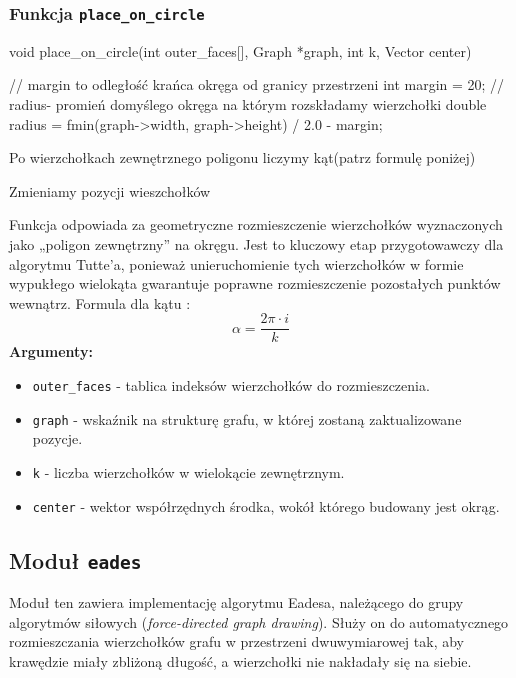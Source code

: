 \documentclass[]{article}
\begin{document}
\subsubsection{Funkcja \texttt{place\_on\_circle}}
\begin{mylisting}
void place_on_circle(int outer_faces[], Graph *graph, int k, Vector center) {
    // margin to odległość krańca okręga od granicy przestrzeni
    int margin = 20;
    // radius- promień domyślego okręga na którym rozskładamy wierzchołki
    double radius = fmin(graph->width, graph->height) / 2.0 - margin;

    Po wierzchołkach zewnętrznego poligonu
        liczymy kąt(patrz formulę poniżej)


        Zmieniamy pozycji wieszchołków
       
    
}
\end{mylisting}
Funkcja odpowiada za geometryczne rozmieszczenie wierzchołków wyznaczonych jako „poligon zewnętrzny” na okręgu. Jest to kluczowy etap przygotowawczy dla algorytmu Tutte'a, ponieważ unieruchomienie tych wierzchołków w formie wypukłego wielokąta gwarantuje poprawne rozmieszczenie pozostałych punktów wewnątrz.
Formula dla kątu :     \[
\alpha = \frac{2 \pi \cdot i}{k}
\]
\textbf{Argumenty:}
\begin{itemize}
\item \texttt{outer\_faces} - tablica indeksów wierzchołków do rozmieszczenia.
\item \texttt{graph} - wskaźnik na strukturę grafu, w której zostaną zaktualizowane pozycje.
\item \texttt{k} - liczba wierzchołków w wielokącie zewnętrznym.
\item \texttt{center} - wektor współrzędnych środka, wokół którego budowany jest okrąg.
\end{itemize}
\subsection{Moduł \texttt{eades}}
Moduł ten zawiera implementację algorytmu Eadesa, należącego do grupy algorytmów siłowych (\textit{force-directed graph drawing}). Służy on do automatycznego rozmieszczania wierzchołków grafu w przestrzeni dwuwymiarowej tak, aby krawędzie miały zbliżoną długość, a wierzchołki nie nakładały się na siebie.
\end{document}
